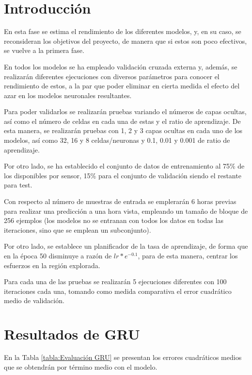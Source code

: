 
\section{Introducción}
En esta fase se estima el rendimiento de los diferentes modelos, y, en su caso, 
se reconsideran los objetivos del proyecto, de manera que si estos son poco efectivos,
se vuelve a la primera fase.

En todos los modelos se ha empleado validación cruzada externa y, además, se realizarán
diferentes ejecuciones con diversos parámetros para conocer el rendimiento de estos, a 
la par que poder eliminar en cierta medida el efecto del azar en los modelos 
neuronales resultantes.

Para poder validarlos se realizarán pruebas variando el números de capas
ocultas, así como el número de celdas en cada una de estas y el ratio de aprendizaje.
De esta manera, se realizarán pruebas con 1, 2 y 3 capas ocultas en cada uno de los modelos, 
así como 32, 16 y 8 celdas/neuronas y 0.1, 0.01 y 0.001 de ratio de aprendizaje. 

Por otro lado, se ha establecido el conjunto de datos de entrenamiento al 75\% de los disponibles
por sensor, 15\% para el conjunto de validación siendo el restante para test.

Con respecto al número de muestras de entrada se emplerarán 6 horas previas para realizar
una predicción a una hora vista, empleando un tamaño de bloque de 256 ejemplos (los modelos 
no se entranan con todos los datos en todas las iteraciones, sino que se emplean un subconjunto).

Por otro lado, se establece un planificador de la tasa de aprendizaje, de forma
que en la época 50 disminuye a razón de \(lr * e^{-0.1}\), para de esta manera,
centrar los esfuerzos en la región explorada.

Para cada una de las pruebas se realizarán 5 ejecuciones diferentes con 100 iteraciones cada una, 
tomando como medida comparativa el error cuadrático medio de validación.

\section{Resultados de GRU}
En la Tabla \ref{tabla:Evaluación GRU} se presentan los errores cuadráticos medios
que se obtendrán por término medio con el modelo. 

